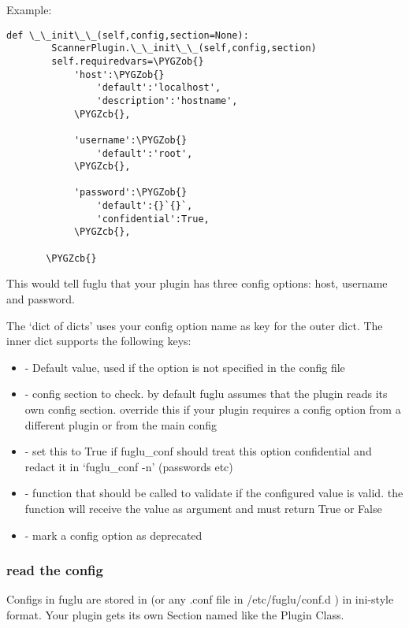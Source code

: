 \documentclass[letterpaper,10pt,english]{sphinxmanual}
\def\PYGZob{\char`\{}
\def\PYGZcb{\char`\}}
\begin{document}
Example:

\begin{Verbatim}[commandchars=\\\{\}]
def \_\_init\_\_(self,config,section=None):
        ScannerPlugin.\_\_init\_\_(self,config,section)
        self.requiredvars=\PYGZob{}
            'host':\PYGZob{}
                'default':'localhost',
                'description':'hostname',
            \PYGZcb{},

            'username':\PYGZob{}
                'default':'root',
            \PYGZcb{},

            'password':\PYGZob{}
                'default':{}`{}`,
                'confidential':True,
            \PYGZcb{},

       \PYGZcb{}
\end{Verbatim}

This would tell fuglu that your plugin has three config options: host, username and password.

The `dict of dicts' uses your config option name as key for the outer dict. The inner dict supports the following keys:
\begin{itemize}
\item {} 
 - Default value, used if the option is not specified in the config file

\item {} 
 - config section to check. by default fuglu assumes that the plugin reads its own config section. override this if your plugin requires a config option from a different plugin or from the main config

\item {} 
 - set this to True if fuglu\_conf should treat this option confidential and redact it in `fuglu\_conf -n' (passwords etc)

\item {} 
 - function that should be called to validate if the configured value is valid. the function will receive the value as argument and must return True or False

\item {} 
 - mark a config option as deprecated

\end{itemize}


\subsubsection{read the config}
\label{plugins-index:read-the-config}
Configs in fuglu are stored in  (or any .conf file in /etc/fuglu/conf.d ) in ini-style format. Your plugin gets its own Section named like the Plugin Class.
\end{document}
